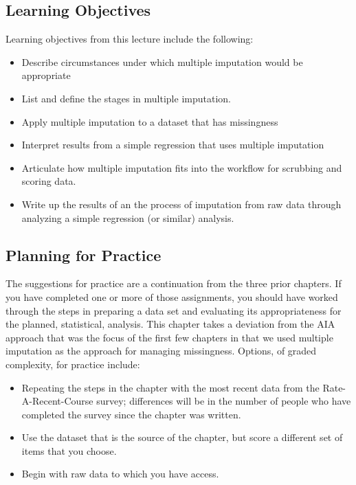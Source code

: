 \documentclass[
  11pt,
]{book}
\providecommand{\tightlist}{%
  \setlength{\itemsep}{0pt}\setlength{\parskip}{0pt}}
\begin{document}
\hypertarget{learning-objectives-3}{%
\subsection{Learning Objectives}\label{learning-objectives-3}}

Learning objectives from this lecture include the following:

\begin{itemize}
\tightlist
\item
  Describe circumstances under which multiple imputation would be appropriate
\item
  List and define the stages in multiple imputation.
\item
  Apply multiple imputation to a dataset that has missingness
\item
  Interpret results from a simple regression that uses multiple imputation
\item
  Articulate how multiple imputation fits into the workflow for scrubbing and scoring data.
\item
  Write up the results of an the process of imputation from raw data through analyzing a simple regression (or similar) analysis.
\end{itemize}

\hypertarget{planning-for-practice-3}{%
\subsection{Planning for Practice}\label{planning-for-practice-3}}

The suggestions for practice are a continuation from the three prior chapters. If you have completed one or more of those assignments, you should have worked through the steps in preparing a data set and evaluating its appropriateness for the planned, statistical, analysis. This chapter takes a deviation from the AIA \citep{parent_handling_2013} approach that was the focus of the first few chapters in that we used multiple imputation as the approach for managing missingness. Options, of graded complexity, for practice include:

\begin{itemize}
\tightlist
\item
  Repeating the steps in the chapter with the most recent data from the Rate-A-Recent-Course survey; differences will be in the number of people who have completed the survey since the chapter was written.
\item
  Use the dataset that is the source of the chapter, but score a different set of items that you choose.
\item
  Begin with raw data to which you have access.
\end{itemize}
\end{document}
